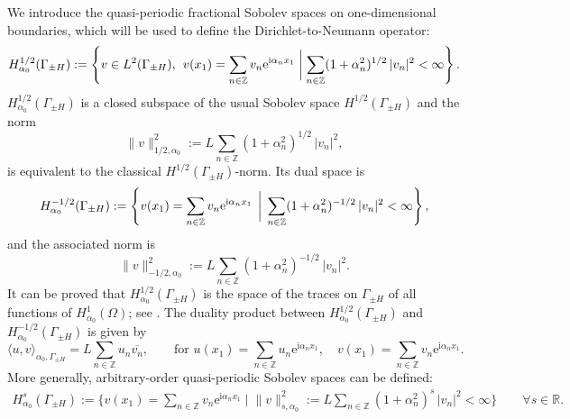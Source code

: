 \documentclass[a4paper,10pt]{article}
\newcommand{\IR}{{\mathbb R}}
\newcommand{\ri}{{\mathrm i}}
\newcommand{\re}{{\mathrm e}}
\newcommand{\GpmH}{{\Gamma_{\pm H}}}
\begin{document}
	We introduce the quasi-periodic fractional Sobolev spaces on one-dimensional boundaries, which will be used to define the Dirichlet-to-Neumann operator:
	\begin{equation*}
		H^{1/2}_{\alpha_0}(\GpmH) := \left\{ v \in L^2(\GpmH), \hspace{0.15cm} v(x_1) = \sum_{n \in \mathbb{Z}} v_n \re^{\ri \alpha_n x_1} \; \biggl| \; \sum_{n \in \mathbb{Z}} (1+\alpha_n^2)^{1/2} \, |v_n|^2 < \infty \right\}.
	\end{equation*}
	$H^{1/2}_{\alpha_0}(\GpmH)$ is a closed subspace of the usual Sobolev space $H^{1/2}(\GpmH)$ and the norm
	\begin{equation*}
		\| v \|_{1/2, \alpha_0}^2 := L \sum_{n \in \mathbb{Z}} (1+\alpha_n^2)^{1/2} \, |v_n|^2,
	\end{equation*}
	is equivalent to the classical $H^{1/2}(\GpmH)$-norm. %
	Its dual space is
	\begin{equation*}
		H^{-1/2}_{\alpha_0}(\GpmH) := \left\{ v(x_1) = \sum_{n \in \mathbb{Z}} v_n \re^{\ri \alpha_n x_1} \hspace{0.15cm} \biggl| \hspace{0.15cm} \sum_{n \in \mathbb{Z}} (1+\alpha_n^2)^{-1/2} \, |v_n|^2 < \infty \right\},
	\end{equation*}
	and the associated norm is
	\begin{equation*}
		\| v \|_{-1/2, \alpha_0}^2 := L \sum_{n \in \mathbb{Z}} (1+\alpha_n^2)^{-1/2} \, |v_n|^2.
	\end{equation*}
	It can be proved that $H^{1/2}_{\alpha_0}(\GpmH)$ is the space of the traces on $\GpmH$ of all functions of $H^1_{\alpha_0}(\Omega)$; see \cite[Lemma~2.27]{Pinto2020}.
	The duality product between $H^{1/2}_{\alpha_0}(\GpmH)$ and $H^{-1/2}_{\alpha_0}(\GpmH)$ is given by 
	\begin{equation*}
		\langle u , v \rangle_{\alpha_0, \GpmH} = L \sum_{n \in \mathbb{Z}} u_n%
		\overline{v_n} %
	,\qquad\text{for }
	u(x_1)= \sum_{n \in \mathbb{Z}} u_n \re^{\ri \alpha_n x_1}%
	, \quad v(x_1)= \sum_{n \in \mathbb{Z}} v_n \re^{\ri \alpha_n x_1}%
	.
\end{equation*}
More generally, arbitrary-order quasi-periodic Sobolev spaces can be defined:
\begin{align}\label{eq:HsNorm}
	H^s_{\alpha_0}(\GpmH) := 
	\bigg\{ v(x_1) = \sum_{n \in \mathbb{Z}} v_n \re^{\ri \alpha_n x_1} \; \biggl| \;
	\|v\|_{s,\alpha_0}^2:=L\sum_{n \in \mathbb{Z}} (1+\alpha_n^2)^s \, |v_n|^2 < \infty \bigg\}
	\qquad\forall s\in\IR.
\end{align}
\end{document}
